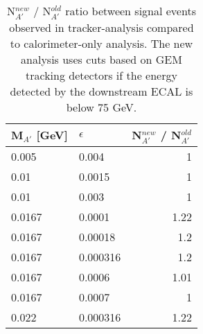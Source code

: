 \begin{center}
\begin{table}
  \centering
  \begin{tabular}{llr}
    \hline
    M$_{A'}$ [GeV]& $\epsilon$ & N$^{new}_{A'}$ / N$^{old}_{A'}$ \\    
    \hline
    0.005  & 0.004    & 1   \\    
    0.01   & 0.0015   & 1   \\    
    0.01   & 0.003    & 1   \\    
    0.0167 & 0.0001   & 1.22\\
    0.0167 & 0.00018  & 1.2 \\    
    0.0167 & 0.000316 & 1.2 \\
    0.0167 & 0.0006   & 1.01\\
    0.0167 & 0.0007   & 1   \\
    0.022  & 0.000316 & 1.22\\
    \hline    
  \end{tabular}
  \caption[ratio between signal events observed in tracker-analysis compared to calorimeter-only analysis]{N$^{new}_{A'}$ / N$^{old}_{A'}$ ratio between signal events observed in tracker-analysis compared to calorimeter-only analysis. The new analysis uses cuts based on GEM tracking detectors if the energy detected by the downstream ECAL is below 75 GeV.}
  \label{tab:dm:efftable}
\end{table}
\end{center}



